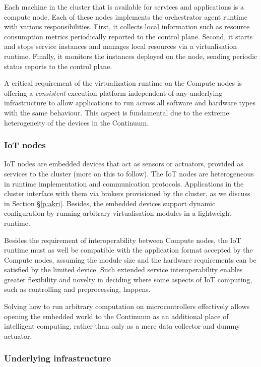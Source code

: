 Each machine in the cluster that is available for services and applications is a compute node. Each of these nodes implements the orchestrator agent runtime with various responsibilities. First, it collects local information such as resource consumption metrics periodically reported to the control plane. Second, it starts and stops service instances and manages local resources via a virtualisation runtime. Finally, it monitors the instances deployed on the node, sending periodic status reports to the control plane.

A critical requirement of the virtualization runtime on the Compute nodes is offering a \textit{consistent} execution platform independent of any underlying infrastructure to allow applications to run across all software and hardware types with the same behaviour. This aspect is fundamental due to the extreme heterogeneity of the devices in the Continuum.

\subsubsection{IoT nodes}

IoT nodes are embedded devices that act as sensors or actuators, provided as services to the cluster (more on this to follow). The IoT nodes are heterogeneous in runtime implementation and communication protocols. Applications in the cluster interface with them via brokers provisioned by the cluster, as we discuss in Section §\ref{p:akri}. Besides, the embedded devices support dynamic configuration by running arbitrary virtualisation modules in a lightweight runtime.

Besides the requirement of interoperability between Compute nodes, the IoT runtime must as well be compatible with the application format accepted by the Compute nodes, assuming the module size and the hardware requirements can be satisfied by the limited device. Such extended service interoperability enables greater flexibility and novelty in deciding where some aspects of IoT computing, such as controlling and preprocessing, happens. 

Solving how to run arbitrary computation on microcontrollers effectively allows opening the embedded world to the Continuum as an additional place of intelligent computing, rather than only as a mere data collector and dummy actuator.

\subsubsection{Underlying infrastructure}

